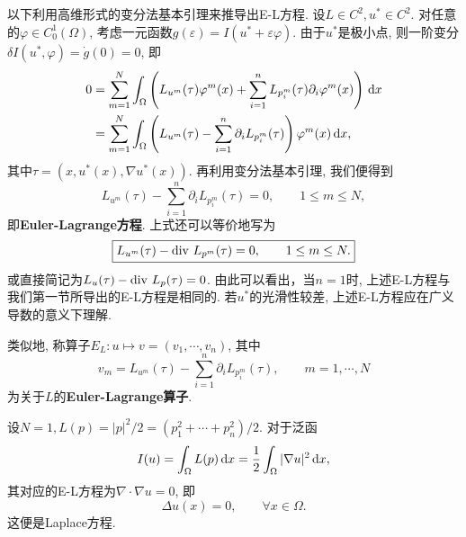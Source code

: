 以下利用高维形式的变分法基本引理来推导出E-L方程. 设$L \in C^2, u^* \in C^2$.
对任意的$\varphi \in C_0^1(\Omega)$, 考虑一元函数$g(\varepsilon) = I(u^* + \varepsilon\varphi)$.
由于$u^*$是极小点, 则一阶变分$\delta I(u^*, \varphi) = \dot g(0) = 0$, 即 
\begin{align*}
    0 &= \sum_{m = 1}^N\int_{\Omega}\left(L_{u^m}(\tau)\varphi^m(x) + \sum_{i = 1}^nL_{p^m_i}(\tau)\partial_i\varphi^m(x)\right)\,{\rm d}x \\  
    &= \sum_{m = 1}^N\int_{\Omega}\left(L_{u^m}(\tau) - \sum_{i = 1}^n\partial_iL_{p^m_i}(\tau)\right)\varphi^m(x) \,{\rm d}x,
\end{align*}
其中$\tau = (x, u^*(x), \nabla u^*(x))$. 再利用变分法基本引理, 我们便得到
\begin{equation*}
    \boxed{L_{u^m}(\tau) - \sum_{i = 1}^n\partial_iL_{p^m_i}(\tau) =0, \qquad 1 \leq m \leq N,}
\end{equation*}
即\textbf{Euler-Lagrange方程}. 上式还可以等价地写为 
\begin{equation*}
    \boxed{L_{u^m}(\tau) - {\rm div}\ L_{p^m}(\tau) = 0, \qquad 1 \leq m \leq N.}
\end{equation*}
或直接简记为$L_u(\tau) - {\rm div}\ L_p(\tau) = 0$. 由此可以看出，当$n = 1$时, 上述E-L方程与我们第一节所导出的E-L方程是相同的.
若$u^*$的光滑性较差, 上述E-L方程应在广义导数的意义下理解.

类似地, 称算子$E_L\colon u \mapsto v = (v_1, \cdots, v_n)$, 其中 
\begin{equation*}
    \boxed{v_m  = L_{u^m}(\tau) - \sum_{i = 1}^n\partial_iL_{p^m_i}(\tau), \qquad m = 1, \cdots, N}
\end{equation*}
为关于$L$的\textbf{Euler-Lagrange算子}.

\begin{example}
    设$N = 1, L(p) = |p|^2/2 = (p_1^2 + \cdots + p_n^2)/2$. 对于泛函 
    \begin{equation*}
        I(u) = \int_{\Omega}L(p) \,{\rm d}x = \frac{1}{2}\int_{\Omega}|\nabla u|^2 \,{\rm d}x,
    \end{equation*}
    其对应的E-L方程为$\nabla \cdot \nabla u = 0$, 即 
    \begin{equation*}
        \Delta u(x) = 0, \qquad \forall x \in \Omega.
    \end{equation*}
    这便是Laplace方程.
\end{example}

